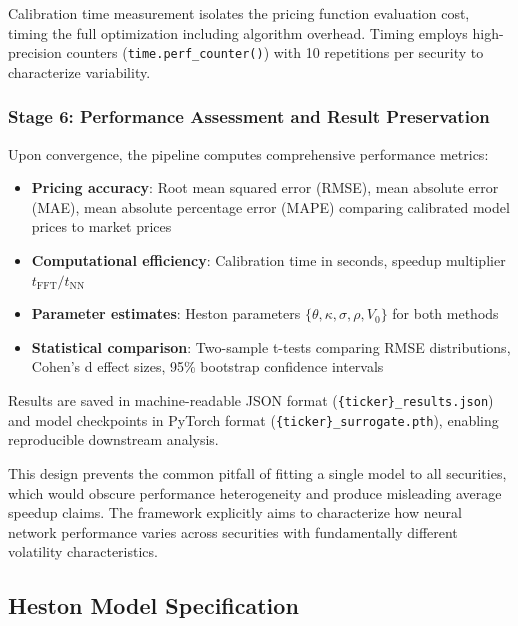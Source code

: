 \documentclass[12pt,a4paper]{article}
\begin{document}
Calibration time measurement isolates the pricing function evaluation cost, timing the full optimization including algorithm overhead. Timing employs high-precision counters (\texttt{time.perf\_counter()}) with 10 repetitions per security to characterize variability.

\subsubsection{Stage 6: Performance Assessment and Result Preservation}

Upon convergence, the pipeline computes comprehensive performance metrics:

\begin{itemize}

\item \textbf{Pricing accuracy}: Root mean squared error (RMSE), mean absolute error (MAE), mean absolute percentage error (MAPE) comparing calibrated model prices to market prices

\item \textbf{Computational efficiency}: Calibration time in seconds, speedup multiplier $t_{\text{FFT}} / t_{\text{NN}}$

\item \textbf{Parameter estimates}: Heston parameters $\{\theta, \kappa, \sigma, \rho, V_0\}$ for both methods

\item \textbf{Statistical comparison}: Two-sample t-tests comparing RMSE distributions, Cohen's d effect sizes, 95\% bootstrap confidence intervals

\end{itemize}

Results are saved in machine-readable JSON format (\texttt{\{ticker\}\_results.json}) and model checkpoints in PyTorch format (\texttt{\{ticker\}\_surrogate.pth}), enabling reproducible downstream analysis.

This design prevents the common pitfall of fitting a single model to all securities, which would obscure performance heterogeneity and produce misleading average speedup claims. The framework explicitly aims to characterize how neural network performance varies across securities with fundamentally different volatility characteristics.

\subsection{Heston Model Specification}
\end{document}
